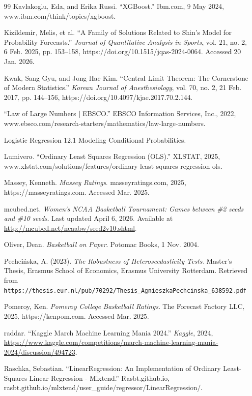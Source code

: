 \documentclass[12pt,leqno]{article}\usepackage[pdftex]{graphicx}\usepackage[dvipsnames]{xcolor}
\theoremstyle{remark}
\begin{document}
\begin{thebibliography}{99}
 Kavlakoglu, Eda, and Erika Russi. “XGBoost.” Ibm.com, 9 May 2024, www.ibm.com/think/topics/xgboost.

 Kizildemir, Melis, et al. “A Family of Solutions Related to Shin’s Model for Probability Forecasts.” \textit{Journal of Quantitative Analysis in Sports}, vol. 21, no. 2, 6 Feb. 2025, pp. 153–158, https://doi.org/10.1515/jqas-2024-0064. Accessed 20 Jan. 2026.

 Kwak, Sang Gyu, and Jong Hae Kim. “Central Limit Theorem: The Cornerstone of Modern Statistics.” \textit{Korean Journal of Anesthesiology}, vol. 70, no. 2, 21 Feb. 2017, pp. 144–156, https://doi.org/10.4097/kjae.2017.70.2.144.

 “Law of Large Numbers | EBSCO.” EBSCO Information Services, Inc., 2022, www.ebsco.com/research-starters/mathematics/law-large-numbers.

 Logistic Regression 12.1 Modeling Conditional Probabilities.

 Lumivero. “Ordinary Least Squares Regression (OLS).” XLSTAT, 2025, www.xlstat.com/solutions/features/ordinary-least-squares-regression-ols.

 Massey, Kenneth. \textit{Massey Ratings}. masseyratings.com, 2025, https://masseyratings.com. Accessed Mar. 2025.

 mcubed.net. \textit{Women's NCAA Basketball Tournament: Games between \#2 seeds and \#10 seeds}. Last updated April 6, 2026. Available at \url{http://mcubed.net/ncaabw/seed2v10.shtml}.

 Oliver, Dean. \textit{Basketball on Paper}. Potomac Books, 1 Nov. 2004.

Pechci\'nska, A. (2023). \textit{The Robustness of Heteroscedasticity Tests}. Master's Thesis, Erasmus School of Economics, Erasmus University Rotterdam. Retrieved from \texttt{https://thesis.eur.nl/pub/70292/Thesis\_AgnieszkaPechcinska\_638592.pdf}

 Pomeroy, Ken. \textit{Pomeroy College Basketball Ratings}. The Forecast Factory LLC, 2025, https://kenpom.com. Accessed Mar. 2025.

 raddar. ``Kaggle March Machine Learning Mania 2024.'' \textit{Kaggle}, 2024, \url{https://www.kaggle.com/competitions/march-machine-learning-mania-2024/discussion/494723}.

 Raschka, Sebastian. “LinearRegression: An Implementation of Ordinary Least-Squares Linear Regression - Mlxtend.” Rasbt.github.io, rasbt.github.io/mlxtend/user\_guide/regressor/LinearRegression/.


\end{thebibliography}
\end{document}
